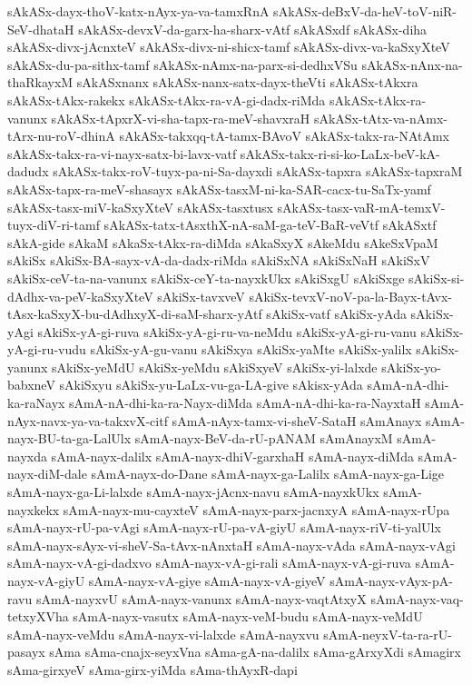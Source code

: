 {sAkASx-dayx-thoV-katx-nAyx-ya-va-tamxRnA
sAkASx-deBxV-da-heV-toV-niR-SeV-dhataH
sAkASx-devxV-da-garx-ha-sharx-vAtf
sAkASxdf
sAkASx-diha
sAkASx-divx-jAcnxteV
sAkASx-divx-ni-shicx-tamf
sAkASx-divx-va-kaSxyXteV
sAkASx-du-pa-sithx-tamf
sAkASx-nAmx-na-parx-si-dedhxVSu
sAkASx-nAnx-na-thaRkayxM
sAkASxnanx
sAkASx-nanx-satx-dayx-theVti
sAkASx-tAkxra
sAkASx-tAkx-rakekx
sAkASx-tAkx-ra-vA-gi-dadx-riMda
sAkASx-tAkx-ra-vanunx
sAkASx-tApxrX-vi-sha-tapx-ra-meV-shavxraH
sAkASx-tAtx-va-nAmx-tArx-nu-roV-dhinA
sAkASx-takxqq-tA-tamx-BAvoV
sAkASx-takx-ra-NAtAmx
sAkASx-takx-ra-vi-nayx-satx-bi-lavx-vatf
sAkASx-takx-ri-si-ko-LaLx-beV-kA-dadudx
sAkASx-takx-roV-tuyx-pa-ni-Sa-dayxdi
sAkASx-tapxra
sAkASx-tapxraM
sAkASx-tapx-ra-meV-shasayx
sAkASx-tasxM-ni-ka-SAR-cacx-tu-SaTx-yamf
sAkASx-tasx-miV-kaSxyXteV
sAkASx-tasxtusx
sAkASx-tasx-vaR-mA-temxV-tuyx-diV-ri-tamf
sAkASx-tatx-tAsxthX-nA-saM-ga-teV-BaR-veVtf
sAkASxtf
sAkA-gide
sAkaM
sAkaSx-tAkx-ra-diMda
sAkaSxyX
sAkeMdu
sAkeSxVpaM
sAkiSx
sAkiSx-BA-sayx-vA-da-dadx-riMda
sAkiSxNA
sAkiSxNaH
sAkiSxV
sAkiSx-ceV-ta-na-vanunx
sAkiSx-ceY-ta-nayxkUkx
sAkiSxgU
sAkiSxge
sAkiSx-si-dAdhx-va-peV-kaSxyXteV
sAkiSx-tavxveV
sAkiSx-tevxV-noV-pa-la-Bayx-tAvx-tAsx-kaSxyX-bu-dAdhxyX-di-saM-sharx-yAtf
sAkiSx-vatf
sAkiSx-yAda
sAkiSx-yAgi
sAkiSx-yA-gi-ruva
sAkiSx-yA-gi-ru-va-neMdu
sAkiSx-yA-gi-ru-vanu
sAkiSx-yA-gi-ru-vudu
sAkiSx-yA-gu-vanu
sAkiSxya
sAkiSx-yaMte
sAkiSx-yalilx
sAkiSx-yanunx
sAkiSx-yeMdU
sAkiSx-yeMdu
sAkiSxyeV
sAkiSx-yi-lalxde
sAkiSx-yo-babxneV
sAkiSxyu
sAkiSx-yu-LaLx-vu-ga-LA-give
sAkisx-yAda
sAmA-nA-dhi-ka-raNayx
sAmA-nA-dhi-ka-ra-Nayx-diMda
sAmA-nA-dhi-ka-ra-NayxtaH
sAmA-nAyx-navx-ya-va-takxvX-citf
sAmA-nAyx-tamx-vi-sheV-SataH
sAmAnayx
sAmA-nayx-BU-ta-ga-LalUlx
sAmA-nayx-BeV-da-rU-pANAM
sAmAnayxM
sAmA-nayxda
sAmA-nayx-dalilx
sAmA-nayx-dhiV-garxhaH
sAmA-nayx-diMda
sAmA-nayx-diM-dale
sAmA-nayx-do-Dane
sAmA-nayx-ga-Lalilx
sAmA-nayx-ga-Lige
sAmA-nayx-ga-Li-lalxde
sAmA-nayx-jAcnx-navu
sAmA-nayxkUkx
sAmA-nayxkekx
sAmA-nayx-mu-cayxteV
sAmA-nayx-parx-jacnxyA
sAmA-nayx-rUpa
sAmA-nayx-rU-pa-vAgi
sAmA-nayx-rU-pa-vA-giyU
sAmA-nayx-riV-ti-yalUlx
sAmA-nayx-sAyx-vi-sheV-Sa-tAvx-nAnxtaH
sAmA-nayx-vAda
sAmA-nayx-vAgi
sAmA-nayx-vA-gi-dadxvo
sAmA-nayx-vA-gi-rali
sAmA-nayx-vA-gi-ruva
sAmA-nayx-vA-giyU
sAmA-nayx-vA-giye
sAmA-nayx-vA-giyeV
sAmA-nayx-vAyx-pA-ravu
sAmA-nayxvU
sAmA-nayx-vanunx
sAmA-nayx-vaqtAtxyX
sAmA-nayx-vaq-tetxyXVha
sAmA-nayx-vasutx
sAmA-nayx-veM-budu
sAmA-nayx-veMdU
sAmA-nayx-veMdu
sAmA-nayx-vi-lalxde
sAmA-nayxvu
sAmA-neyxV-ta-ra-rU-pasayx
sAma
sAma-cnajx-seyxVna
sAma-gA-na-dalilx
sAma-gArxyXdi
sAmagirx
sAma-girxyeV
sAma-girx-yiMda
sAma-thAyxR-dapi
}
